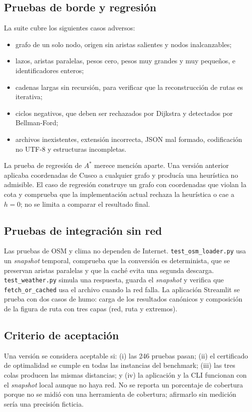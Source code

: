 \subsection{Pruebas de borde y regresión}
La suite cubre los siguientes casos adversos:
\begin{itemize}
    \item grafo de un solo nodo, origen sin aristas salientes y nodos inalcanzables;
    \item lazos, aristas paralelas, pesos cero, pesos muy grandes y muy pequeños, e identificadores enteros;
    \item cadenas largas sin recursión, para verificar que la reconstrucción de rutas es iterativa;
    \item ciclos negativos, que deben ser rechazados por Dijkstra y detectados por Bellman-Ford;
    \item archivos inexistentes, extensión incorrecta, JSON mal formado, codificación no UTF-8 y estructuras incompletas.
\end{itemize}
La prueba de regresión de $A^*$ merece mención aparte. Una versión anterior aplicaba coordenadas de Cusco a cualquier grafo y producía una heurística no admisible. El caso de regresión construye un grafo con coordenadas que violan la cota y comprueba que la implementación actual rechaza la heurística o cae a $h=0$; no se limita a comparar el resultado final.

\subsection{Pruebas de integración sin red}
Las pruebas de OSM y clima no dependen de Internet. \texttt{test\_osm\_loader.py} usa un \textit{snapshot} temporal, comprueba que la conversión es determinista, que se preservan aristas paralelas y que la caché evita una segunda descarga. \texttt{test\_weather.py} simula una respuesta, guarda el \textit{snapshot} y verifica que \texttt{fetch\_or\_cached} usa el archivo cuando la red falla. La aplicación Streamlit se prueba con dos casos de humo: carga de los resultados canónicos y composición de la figura de ruta con tres capas (red, ruta y extremos).

\subsection{Criterio de aceptación}
Una versión se considera aceptable si: (i) las 246 pruebas pasan; (ii) el certificado de optimalidad se cumple en todas las instancias del benchmark; (iii) las tres colas producen las mismas distancias; y (iv) la aplicación y la CLI funcionan con el \textit{snapshot} local aunque no haya red. No se reporta un porcentaje de cobertura porque no se midió con una herramienta de cobertura; afirmarlo sin medición sería una precisión ficticia.
